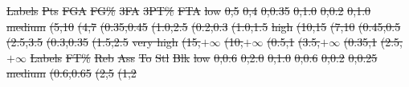 \documentclass[
 size=14pt,
 paper=smartboard,  %
 mode=present, 		%
 display=slides, 	%
 style=tuliplab,  	%
 pauseslide,
 fleqn,leqno]{powerdot}
\providecommand{\DIFdeltex}[1]{{\protect\color{red}\sout{#1}}}                      %
\providecommand{\DIFdelFL}[1]{\DIFdel{#1}} %
\providecommand{\DIFdel}[1]{\texorpdfstring{\DIFdeltex{#1}}{}} %
\begin{document}
\DIFdelFL{Labels }%
\DIFdelFL{Pts }%
\DIFdelFL{FGA }%
\DIFdelFL{FG\% }%
\DIFdelFL{3FA }%
\DIFdelFL{3PT\% }%
\DIFdelFL{FTA  }%
\DIFdelFL{low }%
\DIFdelFL{0,5}%
\DIFdelFL{0,4}%
\DIFdelFL{0,0.35}%
\DIFdelFL{0,1.0}%
\DIFdelFL{0,0.2}%
\DIFdelFL{0,1.0}%
\DIFdelFL{medium}%
\DIFdelFL{(5,10}%
\DIFdelFL{(4,7}%
\DIFdelFL{(0.35,0.45}%
\DIFdelFL{(1.0,2.5}%
\DIFdelFL{(0.2,0.3}%
\DIFdelFL{(1.0,1.5}%
\DIFdelFL{high }%
\DIFdelFL{(10,15}%
\DIFdelFL{(7,10}%
\DIFdelFL{(0.45,0.5}%
\DIFdelFL{(2.5,3.5}%
\DIFdelFL{(0.3,0.35}%
\DIFdelFL{(1.5,2.5}%
\DIFdelFL{very high}%
\DIFdelFL{(15,$+\infty$}%
\DIFdelFL{(10,$+\infty$}%
\DIFdelFL{(0.5,1}%
\DIFdelFL{(3.5,$+\infty$}%
\DIFdelFL{(0.35,1}%
\DIFdelFL{(2.5,$+\infty$}%
\DIFdelFL{Labels }%
\DIFdelFL{FT\% }%
\DIFdelFL{Reb }%
\DIFdelFL{Ass }%
\DIFdelFL{To }%
\DIFdelFL{Stl }%
\DIFdelFL{Blk }%
\DIFdelFL{low   }%
\DIFdelFL{0,0.6}%
\DIFdelFL{0,2.0}%
\DIFdelFL{0,1.0}%
\DIFdelFL{0,0.6}%
\DIFdelFL{0,0.2}%
\DIFdelFL{0,0.25}%
\DIFdelFL{medium}%
\DIFdelFL{(0.6,0.65}%
\DIFdelFL{(2,5}%
\DIFdelFL{(1,2}%
\end{document}

